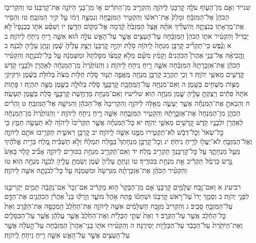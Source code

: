 \documentclass[twoside, openany, parskip=half, 11pt]{book}
\begin{document}
שנייד וְאִ֧ם מִן־הָע֛וֹף עֹלָ֥ה קׇרְבָּנ֖וֹ לַֽיהֹוָ֑ה וְהִקְרִ֣יב מִן־הַתֹּרִ֗ים א֛וֹ מִן־בְּנֵ֥י הַיּוֹנָ֖ה אֶת־קׇרְבָּנֽוֹ׃ טו וְהִקְרִיב֤וֹ הַכֹּהֵן֙ אֶל־הַמִּזְבֵּ֔חַ וּמָלַק֙ אֶת־רֹאשׁ֔וֹ וְהִקְטִ֖יר הַמִּזְבֵּ֑חָה וְנִמְצָ֣ה דָמ֔וֹ עַ֖ל קִ֥יר הַמִּזְבֵּֽחַ׃ טז וְהֵסִ֥יר אֶת־מֻרְאָת֖וֹ בְּנֹצָתָ֑הּ וְהִשְׁלִ֨יךְ אֹתָ֜הּ אֵ֤צֶל הַמִּזְבֵּ֙חַ֙ קֵ֔דְמָה אֶל־מְק֖וֹם הַדָּֽשֶׁן׃ יז וְשִׁסַּ֨ע אֹת֣וֹ בִכְנָפָיו֮ לֹ֣א יַבְדִּיל֒ וְהִקְטִ֨יר אֹת֤וֹ הַכֹּהֵן֙ הַמִּזְבֵּ֔חָה עַל־הָעֵצִ֖ים אֲשֶׁ֣ר עַל־הָאֵ֑שׁ עֹלָ֣ה ה֗וּא אִשֵּׁ֛ה רֵ֥יחַ נִיחֹ֖חַ לַיהֹוָֽה׃
ב א וְנֶ֗פֶשׁ כִּֽי־תַקְרִ֞יב קׇרְבַּ֤ן מִנְחָה֙ לַֽיהֹוָ֔ה סֹ֖לֶת יִהְיֶ֣ה קׇרְבָּנ֑וֹ וְיָצַ֤ק עָלֶ֙יהָ֙ שֶׁ֔מֶן וְנָתַ֥ן עָלֶ֖יהָ לְבֹנָֽה׃ ב וֶֽהֱבִיאָ֗הּ אֶל־בְּנֵ֣י אַהֲרֹן֮ הַכֹּהֲנִים֒ וְקָמַ֨ץ מִשָּׁ֜ם מְלֹ֣א קֻמְצ֗וֹ מִסׇּלְתָּהּ֙ וּמִשַּׁמְנָ֔הּ עַ֖ל כׇּל־לְבֹנָתָ֑הּ וְהִקְטִ֨יר הַכֹּהֵ֜ן אֶת־אַזְכָּרָתָהּ֙ הַמִּזְבֵּ֔חָה אִשֵּׁ֛ה רֵ֥יחַ נִיחֹ֖חַ לַיהֹוָֽה׃ ג וְהַנּוֹתֶ֙רֶת֙ מִן־הַמִּנְחָ֔ה לְאַהֲרֹ֖ן וּלְבָנָ֑יו קֹ֥דֶשׁ קׇֽדָשִׁ֖ים מֵאִשֵּׁ֥י יְהֹוָֽה׃
ד וְכִ֥י תַקְרִ֛ב קׇרְבַּ֥ן מִנְחָ֖ה מַאֲפֵ֣ה תַנּ֑וּר סֹ֣לֶת חַלּ֤וֹת מַצֹּת֙ בְּלוּלֹ֣ת בַּשֶּׁ֔מֶן וּרְקִיקֵ֥י מַצּ֖וֹת מְשֻׁחִ֥ים בַּשָּֽׁמֶן׃
ה וְאִם־מִנְחָ֥ה עַל־הַֽמַּחֲבַ֖ת קׇרְבָּנֶ֑ךָ סֹ֛לֶת בְּלוּלָ֥ה בַשֶּׁ֖מֶן מַצָּ֥ה תִהְיֶֽה׃ ו פָּת֤וֹת אֹתָהּ֙ פִּתִּ֔ים וְיָצַקְתָּ֥ עָלֶ֖יהָ שָׁ֑מֶן מִנְחָ֖ה הִֽוא׃
שלישיז וְאִם־מִנְחַ֥ת מַרְחֶ֖שֶׁת קׇרְבָּנֶ֑ךָ סֹ֥לֶת בַּשֶּׁ֖מֶן תֵּעָשֶֽׂה׃ ח וְהֵבֵאתָ֣ אֶת־הַמִּנְחָ֗ה אֲשֶׁ֧ר יֵעָשֶׂ֛ה מֵאֵ֖לֶּה לַיהֹוָ֑ה וְהִקְרִיבָהּ֙ אֶל־הַכֹּהֵ֔ן וְהִגִּישָׁ֖הּ אֶל־הַמִּזְבֵּֽחַ׃ ט וְהֵרִ֨ים הַכֹּהֵ֤ן מִן־הַמִּנְחָה֙ אֶת־אַזְכָּ֣רָתָ֔הּ וְהִקְטִ֖יר הַמִּזְבֵּ֑חָה אִשֵּׁ֛ה רֵ֥יחַ נִיחֹ֖חַ לַיהֹוָֽה׃ י וְהַנּוֹתֶ֙רֶת֙ מִן־הַמִּנְחָ֔ה לְאַהֲרֹ֖ן וּלְבָנָ֑יו קֹ֥דֶשׁ קׇֽדָשִׁ֖ים מֵאִשֵּׁ֥י יְהֹוָֽה׃ יא כׇּל־הַמִּנְחָ֗ה אֲשֶׁ֤ר תַּקְרִ֙יבוּ֙ לַיהֹוָ֔ה לֹ֥א תֵעָשֶׂ֖ה חָמֵ֑ץ כִּ֤י כׇל־שְׂאֹר֙ וְכׇל־דְּבַ֔שׁ לֹֽא־תַקְטִ֧ירוּ מִמֶּ֛נּוּ אִשֶּׁ֖ה לַֽיהֹוָֽה׃ יב קׇרְבַּ֥ן רֵאשִׁ֛ית תַּקְרִ֥יבוּ אֹתָ֖ם לַיהֹוָ֑ה וְאֶל־הַמִּזְבֵּ֥חַ לֹא־יַעֲל֖וּ לְרֵ֥יחַ נִיחֹֽחַ׃ יג וְכׇל־קׇרְבַּ֣ן מִנְחָתְךָ֮ בַּמֶּ֣לַח תִּמְלָח֒ וְלֹ֣א תַשְׁבִּ֗ית מֶ֚לַח בְּרִ֣ית אֱלֹהֶ֔יךָ מֵעַ֖ל מִנְחָתֶ֑ךָ עַ֥ל כׇּל־קׇרְבָּנְךָ֖ תַּקְרִ֥יב מֶֽלַח׃
יד וְאִם־תַּקְרִ֛יב מִנְחַ֥ת בִּכּוּרִ֖ים לַיהֹוָ֑ה אָבִ֞יב קָל֤וּי בָּאֵשׁ֙ גֶּ֣רֶשׂ כַּרְמֶ֔ל תַּקְרִ֕יב אֵ֖ת מִנְחַ֥ת בִּכּוּרֶֽיךָ׃ טו וְנָתַתָּ֤ עָלֶ֙יהָ֙ שֶׁ֔מֶן וְשַׂמְתָּ֥ עָלֶ֖יהָ לְבֹנָ֑ה מִנְחָ֖ה הִֽוא׃ טז וְהִקְטִ֨יר הַכֹּהֵ֜ן אֶת־אַזְכָּרָתָ֗הּ מִגִּרְשָׂהּ֙ וּמִשַּׁמְנָ֔הּ עַ֖ל כׇּל־לְבֹנָתָ֑הּ אִשֶּׁ֖ה לַיהֹוָֽה׃

רביעיג א וְאִם־זֶ֥בַח שְׁלָמִ֖ים קׇרְבָּנ֑וֹ אִ֤ם מִן־הַבָּקָר֙ ה֣וּא מַקְרִ֔יב אִם־זָכָר֙ אִם־נְקֵבָ֔ה תָּמִ֥ים יַקְרִיבֶ֖נּוּ לִפְנֵ֥י יְהֹוָֽה׃ ב וְסָמַ֤ךְ יָדוֹ֙ עַל־רֹ֣אשׁ קׇרְבָּנ֔וֹ וּשְׁחָט֕וֹ פֶּ֖תַח אֹ֣הֶל מוֹעֵ֑ד וְזָרְק֡וּ בְּנֵי֩ אַהֲרֹ֨ן הַכֹּהֲנִ֧ים אֶת־הַדָּ֛ם עַל־הַמִּזְבֵּ֖חַ סָבִֽיב׃ ג וְהִקְרִיב֙ מִזֶּ֣בַח הַשְּׁלָמִ֔ים אִשֶּׁ֖ה לַיהֹוָ֑ה אֶת־הַחֵ֙לֶב֙ הַֽמְכַסֶּ֣ה אֶת־הַקֶּ֔רֶב וְאֵת֙ כׇּל־הַחֵ֔לֶב אֲשֶׁ֖ר עַל־הַקֶּֽרֶב׃ ד וְאֵת֙ שְׁתֵּ֣י הַכְּלָיֹ֔ת וְאֶת־הַחֵ֙לֶב֙ אֲשֶׁ֣ר עֲלֵהֶ֔ן אֲשֶׁ֖ר עַל־הַכְּסָלִ֑ים וְאֶת־הַיֹּתֶ֙רֶת֙ עַל־הַכָּבֵ֔ד עַל־הַכְּלָי֖וֹת יְסִירֶֽנָּה׃ ה וְהִקְטִ֨ירוּ אֹת֤וֹ בְנֵֽי־אַהֲרֹן֙ הַמִּזְבֵּ֔חָה עַל־הָ֣עֹלָ֔ה אֲשֶׁ֥ר עַל־הָעֵצִ֖ים אֲשֶׁ֣ר עַל־הָאֵ֑שׁ אִשֵּׁ֛ה רֵ֥יחַ נִיחֹ֖חַ לַֽיהֹוָֽה׃
\end{document}
